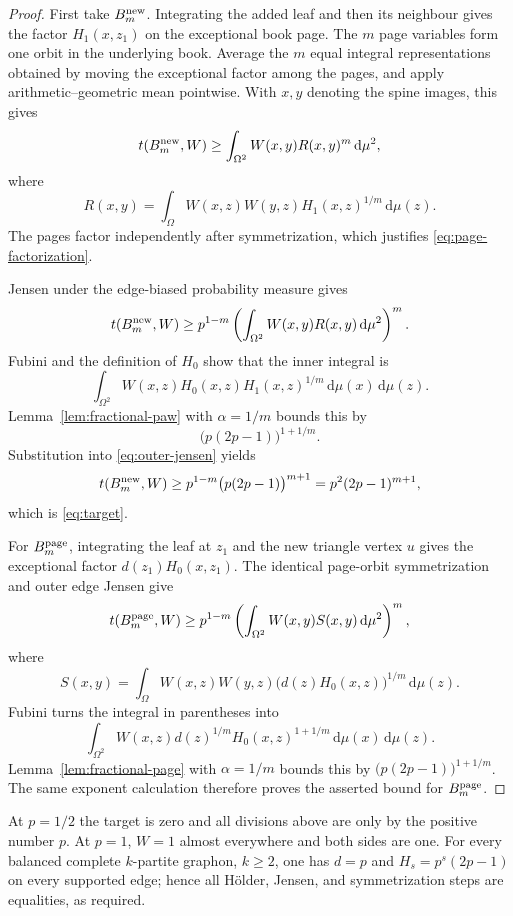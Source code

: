 \documentclass[11pt]{article}
\newcommand{\dd}{\,\mathrm d}
\begin{document}
\begin{proof}
First take $B_m^{\rm new}$.  Integrating the added leaf and then its
neighbour gives the factor $H_1(x,z_1)$ on the exceptional book page.  The
$m$ page variables form one orbit in the underlying book.  Average the $m$
equal integral representations obtained by moving the exceptional factor
among the pages, and apply arithmetic--geometric mean pointwise.  With
$x,y$ denoting the spine images, this gives
\begin{equation}
 t(B_m^{\rm new},W)
 \geq\int_{\Omega^2}W(x,y)R(x,y)^m\dd\mu^2,
 \label{eq:page-factorization}
\end{equation}
where
\[
 R(x,y)=\int_\Omega
 W(x,z)W(y,z)H_1(x,z)^{1/m}\dd\mu(z).
\]
The pages factor independently after symmetrization, which justifies
\eqref{eq:page-factorization}.

Jensen under the edge-biased probability measure gives
\begin{equation}
 t(B_m^{\rm new},W)
 \geq p^{1-m}\left(\int_{\Omega^2}W(x,y)R(x,y)\dd\mu^2\right)^m.
 \label{eq:outer-jensen}
\end{equation}
Fubini and the definition of $H_0$ show that the inner integral is
\[
 \int_{\Omega^2}W(x,z)H_0(x,z)H_1(x,z)^{1/m}\dd\mu(x)\dd\mu(z).
\]
Lemma~\ref{lem:fractional-paw} with $\alpha=1/m$ bounds this by
\[
 \bigl(p(2p-1)\bigr)^{1+1/m}.
\]
Substitution into \eqref{eq:outer-jensen} yields
\[
 t(B_m^{\rm new},W)
 \geq p^{1-m}\bigl(p(2p-1)\bigr)^{m+1}
 =p^2(2p-1)^{m+1},
\]
which is \eqref{eq:target}.

For $B_m^{\rm page}$, integrating the leaf at $z_1$ and the new triangle
vertex $u$ gives the exceptional factor $d(z_1)H_0(x,z_1)$.  The identical
page-orbit symmetrization and outer edge Jensen give
\[
 t(B_m^{\rm page},W)
 \geq p^{1-m}\left(\int_{\Omega^2}W(x,y)S(x,y)\dd\mu^2\right)^m,
\]
where
\[
 S(x,y)=\int_\Omega W(x,z)W(y,z)
 \bigl(d(z)H_0(x,z)\bigr)^{1/m}\dd\mu(z).
\]
Fubini turns the integral in parentheses into
\[
 \int_{\Omega^2}W(x,z)d(z)^{1/m}H_0(x,z)^{1+1/m}
 \dd\mu(x)\dd\mu(z).
\]
Lemma~\ref{lem:fractional-page} with $\alpha=1/m$ bounds this by
$\bigl(p(2p-1)\bigr)^{1+1/m}$.  The same exponent calculation therefore
proves the asserted bound for $B_m^{\rm page}$.
\end{proof}

At $p=1/2$ the target is zero and all divisions above are only by the
positive number $p$.  At $p=1$, $W=1$ almost everywhere and both sides are
one.  For every balanced complete $k$-partite graphon, $k\geq2$, one has
$d=p$ and $H_s=p^s(2p-1)$ on every supported edge; hence all H\"older,
Jensen, and symmetrization steps are equalities, as required.
\end{document}
